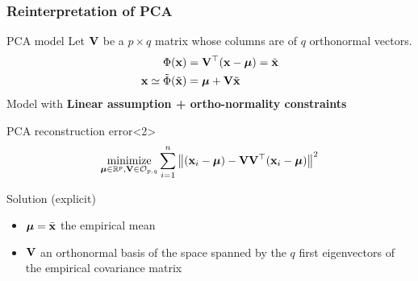 \documentclass{beamer}\usepackage[]{graphicx}\usepackage[]{color}
\begin{document}
\begin{frame}
\frametitle{Reinterpretation of PCA}

  \begin{block}{PCA model}
       Let $\mathbf{V}$ be a $p\times q$ matrix whose columns are of $q$ orthonormal vectors.
      \begin{align*}
        \Phi(\mathbf{x}) & = \mathbf{V}^\top(\mathbf{x}-\boldsymbol{\mu})  = \tilde{\mathbf{x}} \\  
        \mathbf{x} \simeq \tilde{\Phi}(\tilde{\mathbf{x}}) & = \boldsymbol{\mu} + \mathbf{V} \tilde{\mathbf{x}}
      \end{align*}
      \rsa Model with \alert{\bf Linear assumption + ortho-normality constraints}
    \end{block}

  \begin{block}{PCA reconstruction error}<2>
    \vspace{-.25cm}
    \begin{equation*}
      \mathop{\mathrm{minimize}}_{\boldsymbol{\mu} \in\mathbb{R}^p, \mathbf{V}\in\mathcal{O}_{p,q}} \sum_{i=1}^n \left\| (\mathbf{x}_i  - \boldsymbol{\mu}) - \mathbf{V}\mathbf{V}^\top ( \mathbf{x}_i -\boldsymbol{\mu})   \right\|^2 
    \end{equation*}
  
  \alert{Solution (explicit)} 
  \begin{itemize}
  \item $\boldsymbol{\mu} = \bar{\mathbf{x}}$ the empirical mean
  \item $\mathbf{V}$  an orthonormal basis of the space spanned by the $q$ first eigenvectors of the empirical covariance matrix
  \end{itemize}
  
  \end{block}
\end{frame}
\end{document}
